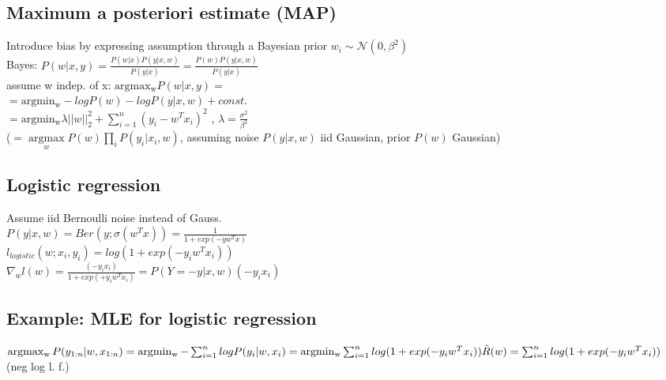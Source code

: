 \subsection*{Maximum a posteriori estimate (MAP)}
Introduce bias by expressing assumption through a Bayesian prior $w_i \sim \mathcal{N}(0, \beta^2)$\\
Bayes: $P(w|x,y) = \frac{P(w|x) P(y|x,w)}{P(y|x)} = \frac{P(w) P(y|x,w)}{P(y|x)}$\\
assume w indep. of x:
$ \operatorname{argmax_w} P(w|x,y)=$\\ 
$= \operatorname{argmin_w} - log P(w) - log P(y|x,w) + const.$ \\
$= \operatorname{argmin_w} \lambda ||w||_2^2 + \sum_{i=1}^n (y_i - w^Tx_i)^2$ , $\lambda = \frac{\sigma^2}{\beta^2}$\\
($=\underset{w}{\operatorname{argmax}} P(w) \prod_i P(y_i|x_i,w)$, assuming noise $P(y|x,w)$ iid Gaussian, prior $P(w)$ Gaussian)

\subsection*{Logistic regression}
Assume iid Bernoulli noise instead of Gauss.\\
$P(y|x,w) = Ber(y; \sigma(w^Tx)) = \frac{1}{1+exp(-y w^T x)}$\\
$l_{logistic}(w;x_i,y_i)=log(1+exp(-y_iw^Tx_i))$\\
$\nabla_wl(w)=\frac{(-y_ix_i)}{1+exp(+y_iw^Tx_i)}=P(Y=-y|x,w)(-y_ix_i)$

\subsection*{Example: MLE for logistic regression}
$\operatorname{argmax_w} P(y_{1:n}|w,x_{1:n})\\
= \operatorname{argmin_w} - \sum_{i=1}^n log P(y_i|w,x_i)\\
= \operatorname{argmin_w} \sum_{i=1}^n log(1+exp(-y_i w^T x_i))\\
\hat{R}(w) = \sum_{i=1}^n log(1+exp(-y_i w^T x_i))$ (neg log l. f.)

